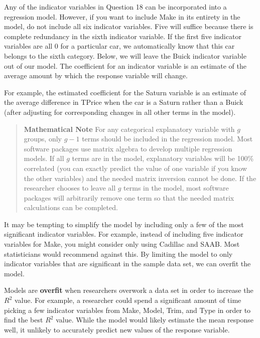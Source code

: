 \documentclass[
]{report}
\theoremstyle{definition}
\theoremstyle{definition}
\theoremstyle{definition}
\theoremstyle{definition}
\theoremstyle{remark}
\begin{document}
Any of the indicator variables in Question 18 can be incorporated into a regression model. However, if you want to include Make in its entirety in the model, do not include all six indicator variables. Five will suffice because there is complete redundancy in the sixth indicator variable. If the first five indicator variables are all 0 for a particular car, we automatically know that this car belongs to
the sixth category. Below, we will leave the Buick indicator variable out of our model. The coefficient for an indicator variable is an estimate of the average amount by which the response variable will change.

For example, the estimated coefficient for the Saturn variable is an estimate of the average difference in TPrice when the car is a Saturn rather than a Buick (after adjusting for corresponding changes in all other terms in the model).

\begin{quote}
\textbf{Mathematical Note}
For any categorical explanatory variable with \(g\) groups, only \(g - 1\) terms should be included in the regression model. Most software packages use matrix algebra to develop multiple regression models. If all \(g\) terms are in the model, explanatory variables will be 100\% correlated (you can exactly predict the value of one variable if you know the other variables) and the needed matrix inversion cannot be done. If
the researcher chooses to leave all \(g\) terms in the model, most software packages will arbitrarily remove one term so that the needed matrix calculations can be completed.
\end{quote}

It may be tempting to simplify the model by including only a few of the most significant indicator variables. For example, instead of including five indicator variables for Make, you might consider only using Cadillac and SAAB. Most statisticians would recommend against this. By limiting the model to only indicator
variables that are significant in the sample data set, we can overfit the model.

Models are \textbf{overfit} when researchers overwork a data set in order to increase the \(R^2\) value. For example, a researcher could spend a significant amount of time picking a few indicator variables from Make, Model, Trim, and Type in order to find the best \(R^2\) value. While the model would likely estimate the mean response well, it unlikely to accurately predict new values of the response variable.
\end{document}
